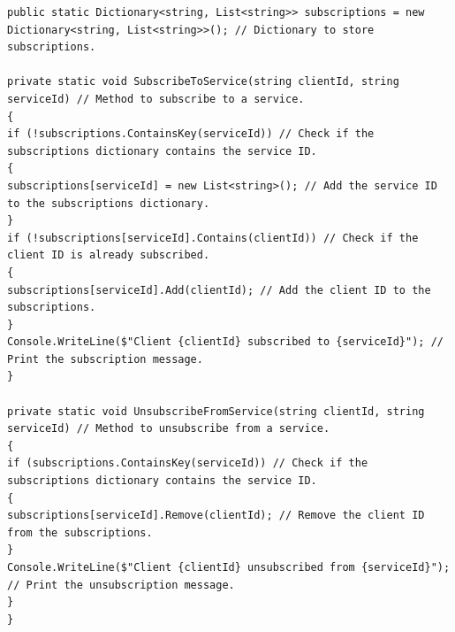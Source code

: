 \documentclass[12pt]{article}
\begin{document}
{\begin{verbatim}
public static Dictionary<string, List<string>> subscriptions = new Dictionary<string, List<string>>(); // Dictionary to store subscriptions.

private static void SubscribeToService(string clientId, string serviceId) // Method to subscribe to a service.
{
if (!subscriptions.ContainsKey(serviceId)) // Check if the subscriptions dictionary contains the service ID.
{
subscriptions[serviceId] = new List<string>(); // Add the service ID to the subscriptions dictionary.
}
if (!subscriptions[serviceId].Contains(clientId)) // Check if the client ID is already subscribed.
{
subscriptions[serviceId].Add(clientId); // Add the client ID to the subscriptions.
}
Console.WriteLine($"Client {clientId} subscribed to {serviceId}"); // Print the subscription message.
}

private static void UnsubscribeFromService(string clientId, string serviceId) // Method to unsubscribe from a service.
{
if (subscriptions.ContainsKey(serviceId)) // Check if the subscriptions dictionary contains the service ID.
{
subscriptions[serviceId].Remove(clientId); // Remove the client ID from the subscriptions.
}
Console.WriteLine($"Client {clientId} unsubscribed from {serviceId}"); // Print the unsubscription message.
}
}

\end{verbatim}
}
\end{document}
